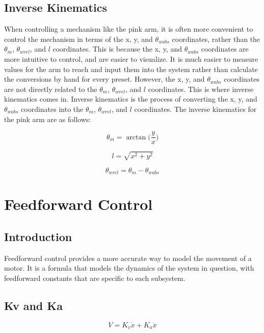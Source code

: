 \documentclass{scrartcl}
\begin{document}
\subsection{Inverse Kinematics}
When controlling a mechanism like the pink arm, it is often more convenient to control the mechanism in terms of the x, y, and \(\theta_{wabs}\) coordinates, rather than the \(\theta_m\), \(\theta_{wrel}\), and \(l\) coordinates. This is because the x, y, and \(\theta_{wabs}\) coordinates are more intuitive to control, and are easier to visualize. It is much easier to measure values for the arm to reach and input them into the system rather than calculate the conversions by hand for every preset. However, the x, y, and \(\theta_{wabs}\) coordinates are not directly related to the \(\theta_m\), \(\theta_{wrel}\), and \(l\) coordinates. This is where inverse kinematics comes in. Inverse kinematics is the process of converting the x, y, and \(\theta_{wabs}\) coordinates into the \(\theta_m\), \(\theta_{wrel}\), and \(l\) coordinates. The inverse kinematics for the pink arm are as follows:

\begin{equation} \label{theta_m}
    \theta_m = \arctan\biggl(\frac{y}{x}\biggl)
\end{equation}

\begin{equation} \label{l}
    l = \sqrt{x^2 + y^2}
\end{equation}

\begin{equation} \label{theta_wrel}
    \theta_{wrel} = \theta_m - \theta_{wabs}
\end{equation}

\section{Feedforward Control}

\subsection{Introduction}
Feedforward control provides a more accurate way to model the movement of a motor. It is a formula that models the dynamics of the system in question, with feedforward constants that are specific to each subsystem.

\subsection{Kv and Ka}
\begin{equation} \label{Motor Feedforward Equation}
    V = K_v \dot{x} + K_a \ddot{x}
\end{equation}
\end{document}
